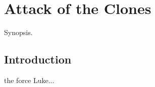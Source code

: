 
\chapter{Attack of the Clones}
	\label{chapter:attack-of-the-clones}%



\begin{synopsis}
	Synopsis.
\end{synopsis}


\section{Introduction}

 the force Luke...

